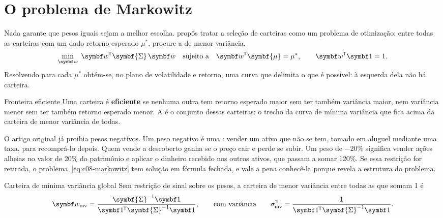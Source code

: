 \section{O problema de Markowitz}
\label{sec:c08-markowitz}

Nada garante que pesos iguais sejam a melhor escolha. \citet{markowitz1952} propôs tratar a seleção de carteiras como um problema de otimização: entre todas as carteiras com um dado retorno esperado $\mu^{\ast}$, procure a de menor variância,
\begin{equation}
  \min_{\vetor{w}}\; \vetor{w}\T\symbf{\Sigma}\,\vetor{w}
  \quad\text{sujeito a}\quad
  \vetor{w}\T\symbf{\mu} = \mu^{\ast}, \qquad \vetor{w}\T\vetor{1} = 1 .
  \label{eq:c08-markowitz}
\end{equation}
Resolvendo para cada $\mu^{\ast}$ obtém-se, no plano de volatilidade e retorno, uma curva que delimita o que é possível: à esquerda dela não há carteira.

\begin{definicao}{Fronteira eficiente}
Uma carteira é \textbf{eficiente} se nenhuma outra tem retorno esperado maior sem ter também variância maior, nem variância menor sem ter também retorno esperado menor. A  é o conjunto dessas carteiras: o trecho da curva de mínima variância que fica acima da carteira de menor variância de todas.
\end{definicao}

O artigo original já proibia pesos negativos. Um peso negativo é uma : vender um ativo que não se tem, tomado em aluguel mediante uma taxa, para recomprá-lo depois. Quem vende a descoberto ganha se o preço cair e perde se subir. Um peso de $-20\%$ significa vender ações alheias no valor de 20\% do patrimônio e aplicar o dinheiro recebido nos outros ativos, que passam a somar 120\%. Se essa restrição for retirada, o problema~\eqref{eq:c08-markowitz} tem solução em fórmula fechada, e vale a pena conhecê-la porque revela a estrutura do problema.

\begin{resultado}{Carteira de mínima variância global}
Sem restrição de sinal sobre os pesos, a carteira de menor variância entre todas as que somam 1 é
\begin{equation}
  \vetor{w}_{\text{mv}} = \frac{\symbf{\Sigma}^{-1}\vetor{1}}{\vetor{1}\T\symbf{\Sigma}^{-1}\vetor{1}} ,
  \qquad\text{com variância}\qquad
  \sigma_{\text{mv}}^2 = \frac{1}{\vetor{1}\T\symbf{\Sigma}^{-1}\vetor{1}} .
  \label{eq:c08-mv}
\end{equation}
\end{resultado}

